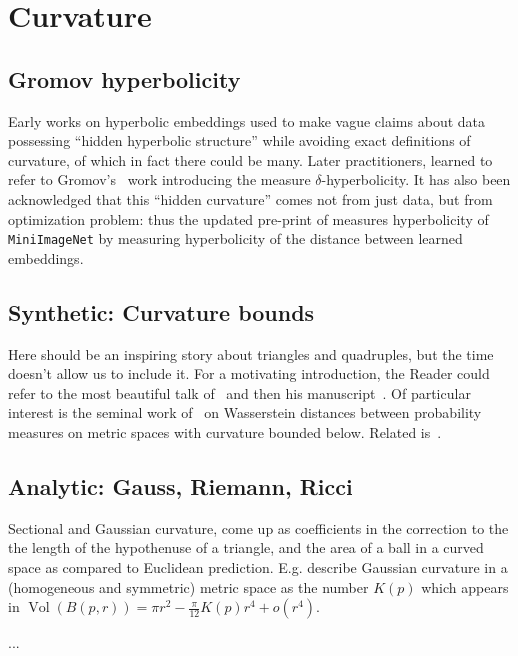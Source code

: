 \section{Curvature} \label{sec:curvature}

\subsection*{Gromov hyperbolicity}

Early works on hyperbolic embeddings used to make vague claims about data
possessing ``hidden hyperbolic structure'' while avoiding exact definitions of
curvature, of which in fact there could be many. Later practitioners, learned
to refer to Gromov's~\cite{gromov} work introducing the measure \( \delta
\)-hyperbolicity.  It has also been acknowledged that this ``hidden curvature''
comes not from just data, but from optimization problem: thus the updated
pre-print of \citet{khrulkov} measures hyperbolicity of \texttt{MiniImageNet}
by measuring hyperbolicity of the distance between learned embeddings.

\subsection*{Synthetic: Curvature bounds}

Here should be an inspiring story about triangles and quadruples, but the
time doesn't allow us to include it.
For a motivating introduction, the Reader could refer to the most beautiful
talk of~\citet{villaniTriangles} and then his manuscript~\cite{villaniOldNew}.
Of particular interest is the seminal work of~\citet{sturm} on Wasserstein
distances between probability measures on metric spaces with curvature bounded
below. Related is~\citet{le2017existence}.

\subsection*{Analytic: Gauss, Riemann, Ricci}

Sectional and Gaussian curvature, come up as coefficients in the correction to
the the length of the hypothenuse of a triangle, and the area of a ball in a
curved space as compared to Euclidean prediction.
E.g. \citet{burago} describe Gaussian curvature in a (homogeneous and
symmetric) metric space as the number \( K(p) \) which appears in \(
\operatorname{Vol}(B(p, r)) = \pi r^2 - \frac{\pi}{12}K(p) r^4 + o(r^4) \).

...

